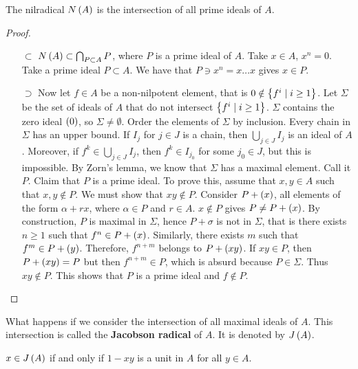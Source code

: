 \begin{proposition}
The nilradical $ N\left( A \right) $ is the intersection of all prime ideals of $ A $.
\end{proposition}

\begin{proof}
\hfill
\begin{itemize}
\item[$ \subset $] $ N\left( A \right) \subset \bigcap_{P \subset A} P $, where $ P $ is a prime ideal of $ A $. Take $ x \in A $, $ x^n = 0 $. Take a prime ideal $ P \subset A $. We have that $ P \ni x^n = x \dots x $ gives $ x \in P $.
\item[$ \supset $] Now let $ f \in A $ be a non-nilpotent element, that is $ 0 \notin \left\{ f^i \mid i \ge 1 \right\} $. Let $ \Sigma $ be the set of ideals of $ A $ that do not intersect $ \left\{ f^i \mid i \ge 1 \right\} $. $ \Sigma $ contains the zero ideal $ \left( 0 \right) $, so $ \Sigma \ne \emptyset $. Order the elements of $ \Sigma $ by inclusion. Every chain in $ \Sigma $ has an upper bound. If $ I_j $ for $ j \in J $ is a chain, then $ \bigcup_{j \in J} I_j $ is an ideal of $ A $. Moreover, if $ f^k \in \bigcup_{j \in J} I_j $, then $ f^k \in I_{j_0} $ for some $ j_0 \in J $, but this is impossible. By Zorn's lemma, we know that $ \Sigma $ has a maximal element. Call it $ P $. Claim that $ P $ is a prime ideal. To prove this, assume that $ x, y \in A $ such that $ x, y \notin P $. We must show that $ xy \notin P $. Consider $ P + \left( x \right) $, all elements of the form $ \alpha + rx $, where $ \alpha \in P $ and $ r \in A $. $ x \notin P $ gives $ P \ne P + \left( x \right) $. By construction, $ P $ is maximal in $ \Sigma $, hence $ P + \sigma $ is not in $ \Sigma $, that is there exists $ n \ge 1 $ such that $ f^n \in P + \left( x \right) $. Similarly, there exists $ m $ such that $ f^m \in P + \left( y \right) $. Therefore, $ f^{n + m} $ belongs to $ P + \left( xy \right) $. If $ xy \in P $, then $ P + \left( xy \right) = P $ but then $ f^{n + m} \in P $, which is absurd because $ P \in \Sigma $. Thus $ xy \notin P $. This shows that $ P $ is a prime ideal and $ f \notin P $.
\end{itemize}
\end{proof}

What happens if we consider the intersection of all maximal ideals of $ A $. This intersection is called the \textbf{Jacobson radical} of $ A $. It is denoted by $ J\left( A \right) $.

\begin{proposition}
\label{prop:5.3}
$ x \in J\left( A \right) $ if and only if $ 1 - xy $ is a unit in $ A $ for all $ y \in A $.
\end{proposition}

